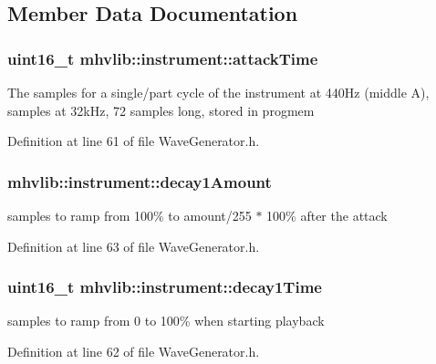 \subsection{Member Data Documentation}
\hypertarget{structmhvlib_1_1instrument_a0d05a7a3daa565dabc52684acd044e72}{
\subsubsection[{attack\-Time}]{\setlength{\rightskip}{0pt plus 5cm}uint16\-\_\-t mhvlib\-::instrument\-::attack\-Time}}\label{structmhvlib_1_1instrument_a0d05a7a3daa565dabc52684acd044e72}
The samples for a single/part cycle of the instrument at 440\-Hz (middle A), samples at 32k\-Hz, 72 samples long, stored in progmem 

Definition at line 61 of file Wave\-Generator.\-h.

\hypertarget{structmhvlib_1_1instrument_a5a2bccc6b70888b36c503d3b4ecbb9da}{
\subsubsection[{decay1\-Amount}]{ mhvlib\-::instrument\-::decay1\-Amount}}\label{structmhvlib_1_1instrument_a5a2bccc6b70888b36c503d3b4ecbb9da}
samples to ramp from 100\% to amount/255 $\ast$ 100\% after the attack 

Definition at line 63 of file Wave\-Generator.\-h.

\hypertarget{structmhvlib_1_1instrument_a7f1d44aca6041666220e502a00ac8553}{
\subsubsection[{decay1\-Time}]{\setlength{\rightskip}{0pt plus 5cm}uint16\-\_\-t mhvlib\-::instrument\-::decay1\-Time}}\label{structmhvlib_1_1instrument_a7f1d44aca6041666220e502a00ac8553}
samples to ramp from 0 to 100\% when starting playback 

Definition at line 62 of file Wave\-Generator.\-h.

